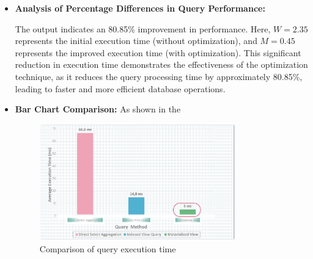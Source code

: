\begin{enumerate}
\begin{itemize}
 

 \item\textbf{Analysis of Percentage Differences in Query Performance:}
 

The output indicates an 80.85\% improvement in performance. Here, \( W = 2.35 \) represents the initial execution time (without optimization), and \( M = 0.45 \) represents the improved execution time (with optimization). This significant reduction in execution time demonstrates the effectiveness of the optimization technique, as it reduces the query processing time by approximately 80.85\%, leading to faster and more efficient database operations.

\item \textbf{Bar Chart Comparison:} As shown in the %



\begin{figure}[H]
\centering
\includegraphics[width=0.8\textwidth]{Figure/Bar_chart.png} %
\caption{Comparison of query execution time} %
\label{fig:execution-plan} %
\end{figure}



\end{itemize}
\end{enumerate}
